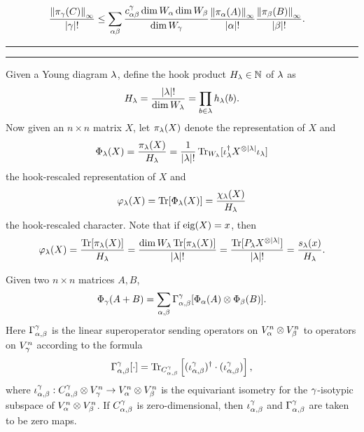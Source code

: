 \documentclass[notitlepage, 10pt]{article}
\begin{document}
    \begin{align}
        \frac{\left\lVert\pi_{\gamma}(C)\right\rVert_{\infty}}{{|\gamma|}!}
        &\leq \sum_{\alpha\beta} \frac{c^{\gamma}_{\alpha\beta}\dim W_{\alpha}\dim W_{\beta}}{\dim W_{\gamma}} \frac{\left\lVert\pi_\alpha(A)\right\rVert_{\infty}}{{|\alpha|}!} \frac{\left\lVert\pi_\beta(B)\right\rVert_{\infty}}{{|\beta|}!}.
    \end{align}
\hrule
\clearpage
\hrule
    \begin{defn}
        Given a Young diagram $\lambda$, define the hook product $H_{\lambda} \in \mathbb N$ of $\lambda$ as
        \begin{equation}
            H_{\lambda} = \frac{{|\lambda|}!}{\dim W_{\lambda}} = \prod_{b \in \lambda}h_{\lambda}(b).
        \end{equation}
        Now given an $n\times n$ matrix $X$, let $\pi_{\lambda}(X)$ denote the representation of $X$ and
        \begin{equation}
            \Phi_{\lambda}(X) = \frac{\pi_{\lambda}(X)}{H_{\lambda}} = \frac{1}{{|\lambda|}!}\operatorname{Tr}_{W_{\lambda}}[\iota_{\lambda}^{\dagger} X^{\otimes {|\lambda|}} \iota_{\lambda}]
        \end{equation}
        the hook-rescaled representation of $X$ and
        \begin{equation}
            \varphi_{\lambda}(X) = \operatorname{Tr}[\Phi_{\lambda}(X)] = \frac{\chi_{\lambda}(X)}{H_{\lambda}}
        \end{equation}
        the hook-rescaled character.
        Note that if $\operatorname{eig}(X) = x$, then
        \begin{equation}
            \varphi_{\lambda}(X) = \frac{\operatorname{Tr}[\pi_{\lambda}(X)]}{H_{\lambda}} = \frac{\dim W_{\lambda} \operatorname{Tr}[\pi_{\lambda}(X)]}{{|\lambda|}!} = \frac{\operatorname{Tr}[P_\lambda X^{\otimes {|\lambda|}}]}{{|\lambda|}!} = \frac{s_{\lambda}(x)}{H_{\lambda}}.
        \end{equation}
    \end{defn}
    \begin{prop}
        Given two $n\times n$ matrices $A,B$,
        \begin{equation}
            \Phi_{\gamma}(A+B) = \sum_{\alpha,\beta} \Gamma^{\gamma}_{\alpha,\beta}[ \Phi_{\alpha}(A) \otimes \Phi_{\beta}(B) ].
        \end{equation}
        Here $\Gamma^{\gamma}_{\alpha,\beta}$ is the linear superoperator sending operators on $V_{\alpha}^{n} \otimes V_{\beta}^{n}$ to operators on $V_{\gamma}^{n}$ according to the formula
        \begin{equation}
            \Gamma^{\gamma}_{\alpha,\beta}[\cdot] = \operatorname{Tr}_{C^{\gamma}_{\alpha,\beta}} \left[ (\iota^{\gamma}_{\alpha,\beta})^{\dagger} \cdot (\iota^{\gamma}_{\alpha,\beta}) \right],
        \end{equation}
        where $\iota^{\gamma}_{\alpha,\beta} : C^{\gamma}_{\alpha,\beta} \otimes V_{\gamma}^{n} \to V_{\alpha}^{n} \otimes V_{\beta}^{n}$ is the equivariant isometry for the $\gamma$-isotypic subspace of $V_{\alpha}^{n} \otimes V_{\beta}^{n}$.
        If $C^{\gamma}_{\alpha,\beta}$ is zero-dimensional, then $\iota^{\gamma}_{\alpha,\beta}$ and $\Gamma^{\gamma}_{\alpha,\beta}$ are taken to be zero maps.
    \end{prop}
\end{document}
